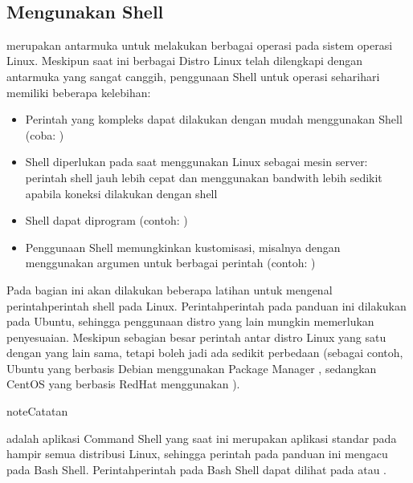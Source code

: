 \documentclass[letterpaper,10pt,english]{sphinxmanual}
\begin{document}
 


\subsection{Mengunakan Shell}
\label{\detokenize{sesi1/arsitektur:mengunakan-shell}}
 merupakan antarmuka untuk melakukan berbagai operasi pada sistem operasi Linux. Meskipun saat ini berbagai Distro Linux telah dilengkapi dengan antarmuka yang sangat canggih, penggunaan Shell untuk operasi sehari\sphinxhyphen{}hari memiliki beberapa kelebihan:
\begin{itemize}
\item {} 
Perintah yang kompleks dapat dilakukan dengan mudah menggunakan Shell (coba: )

\item {} 
Shell diperlukan pada saat menggunakan Linux sebagai mesin server: perintah shell jauh lebih cepat dan menggunakan bandwith lebih sedikit apabila koneksi dilakukan dengan shell

\item {} 
Shell dapat diprogram (contoh: )

\item {} 
Penggunaan Shell memungkinkan kustomisasi, misalnya dengan menggunakan argumen untuk berbagai perintah (contoh: )

\end{itemize}

Pada bagian ini akan dilakukan beberapa latihan untuk mengenal perintah\sphinxhyphen{}perintah shell pada Linux. Perintah\sphinxhyphen{}perintah pada panduan ini dilakukan pada Ubuntu, sehingga penggunaan distro yang lain mungkin memerlukan penyesuaian. Meskipun sebagian besar perintah antar distro Linux yang satu dengan yang lain sama, tetapi boleh jadi ada sedikit perbedaan (sebagai contoh, Ubuntu yang berbasis Debian menggunakan Package Manager , sedangkan CentOS yang berbasis RedHat menggunakan ).

\begin{sphinxadmonition}{note}{Catatan}

 adalah aplikasi Command Shell yang saat ini merupakan aplikasi standar pada hampir semua distribusi Linux, sehingga perintah pada panduan ini mengacu pada Bash Shell. Perintah\sphinxhyphen{}perintah pada Bash Shell dapat dilihat pada  atau .
\end{sphinxadmonition}
\end{document}
